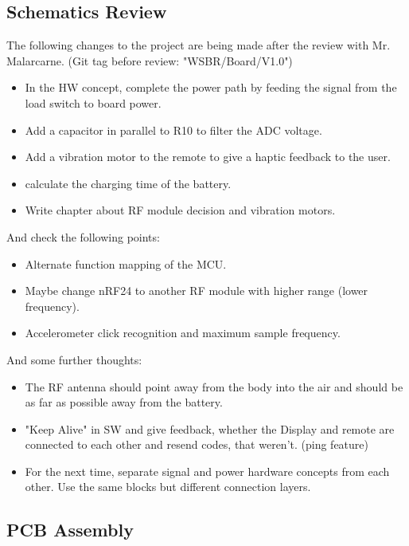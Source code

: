 \subsection{Schematics Review}
 \label{ssec:Remote Schematics Review}
 The following changes to the project are being made after the review with Mr. Malarcarne. (Git tag before review: "WSBR/Board/V1.0")
 \begin{itemize}
     \item In the HW concept, complete the power path by feeding the signal from the load switch to board power.
     \item Add a capacitor in parallel to R10 to filter the ADC voltage.
     \item Add a vibration motor to the remote to give a haptic feedback to the user.
     \item calculate the charging time of the battery.
     \item Write chapter about RF module decision and vibration motors.
 \end{itemize}

 And check the following points:
 \begin{itemize}
     \item Alternate function mapping of the MCU.
     \item Maybe change nRF24 to another RF module with higher range (lower frequency).
     \item Accelerometer click recognition and maximum sample frequency.
 \end{itemize}

 And some further thoughts:
 \begin{itemize}
     \item The RF antenna should point away from the body into the air and should be as far as possible away from the battery.
     \item "Keep Alive" in SW and give feedback, whether the Display and remote are connected to each other and resend codes, that weren't. (ping feature)
     \item For the next time, separate signal and power hardware concepts from each other. Use the same blocks but different connection layers.
 \end{itemize}



 \subsection{PCB Assembly}
 \label{ssec:PCB Assembly}

